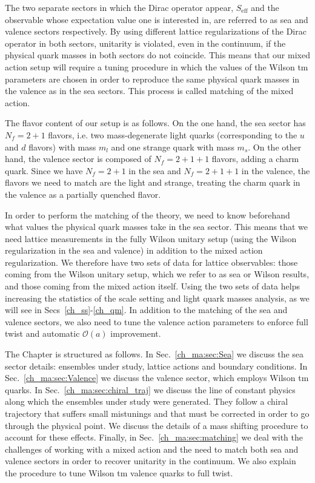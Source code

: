 The two separate sectors in which the Dirac operator appear, $S_{\textrm{eff}}$ and the observable whose expectation value one is interested in, are referred to as sea and valence sectors respectively. By using different lattice regularizations of the Dirac operator in both sectors, unitarity is violated, even in the continuum, if the physical quark masses in both sectors do not coincide. This means that our mixed action setup will require a tuning procedure in which the values of the Wilson tm parameters are chosen in order to reproduce the same physical quark masses in the valence as in the sea sectors. This process is called matching of the mixed action.

The flavor content of our setup is as follows. On the one hand, the sea sector has $N_f=2+1$ flavors, i.e. two mass-degenerate light quarks (corresponding to the $u$ and $d$ flavors) with mass $m_l$ and one strange quark with mass $m_s$. On the other hand, the valence sector is composed of $N_f=2+1+1$ flavors, adding a charm quark. Since we have $N_f=2+1$ in the sea and $N_f=2+1+1$ in the valence, the flavors we need to match are the light and strange, treating the charm quark in the valence as a partially quenched flavor. 

In order to perform the matching of the theory, we need to know beforehand what values the physical quark masses take in the sea sector. This means that we need lattice measurements in the fully Wilson unitary setup (using the Wilson regularization in the sea and valence) in addition to the mixed action regularization. We therefore have two sets of data for lattice observables: those coming from the Wilson unitary setup, which we refer to as sea or Wilson results, and those coming from the mixed action itself. Using the two sets of data helps increasing the statistics of the scale setting and light quark masses analysis, as we will see in Secs~\ref{ch_ss}-\ref{ch_qm}. In addition to the matching of the sea and valence sectors, we also need to tune the valence action parameters to enforce full twist and automatic $\mathcal{O}(a)$ improvement.

The Chapter is structured as follows. In Sec.~\ref{ch_ma:sec:Sea} we discuss the sea sector details: ensembles under study, lattice actions and boundary conditions. In Sec.~\ref{ch_ma:sec:Valence} we discuss the valence sector, which employs Wilson tm quarks. In Sec.~\ref{ch_ma:sec:chiral_traj} we discuss the line of constant physics along which the ensembles under study were generated. They follow a chiral trajectory that suffers small mistunings and that must be corrected in order to go through the physical point. We discuss the details of a mass shifting procedure to account for these effects. Finally, in Sec.~\ref{ch_ma:sec:matching} we deal with the challenges of working with a mixed action and the need to match both sea and valence sectors in order to recover unitarity in the continuum. We also explain the procedure to tune Wilson tm valence quarks to full twist.

